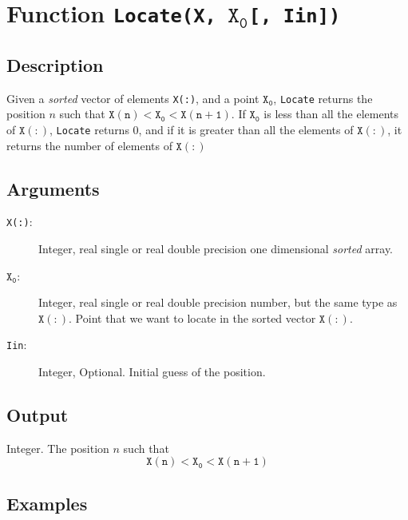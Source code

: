 \section{Function \texttt{Locate(X, $\mathtt{X_0}$[, Iin])}}

\subsection{Description}

Given a \emph{sorted} vector of elements \texttt{X(:)}, and a point
$\mathtt{X_0}$, \texttt{Locate} returns the position $n$ such that
$\mathtt{X(n)<X_0<X(n+1)}$. If  $\mathtt{X_0}$ is less than all the
elements of $\mathtt{X(:)}$, \texttt{Locate} returns $0$, and if it is
greater than all the elements of $\mathtt{X(:)}$, it returns the
number of elements of $\mathtt{X(:)}$

\subsection{Arguments}

\begin{description}
\item[\texttt{X(:)}: ] Integer, real single or real double precision one
  dimensional \emph{sorted} array. 
\item[$\mathtt{X_0}$: ] Integer, real single or real double precision
  number, but the same type as $\mathtt{X(:)}$. Point that we want to
  locate in the sorted vector $\mathtt{X(:)}$.
\item[\texttt{Iin}: ] Integer, Optional. Initial guess of the position.
\end{description}

\subsection{Output}

Integer. The position $n$ such that 
\begin{displaymath}
  \mathtt{X(n)<X_0<X(n+1)}  
\end{displaymath}

\subsection{Examples}

